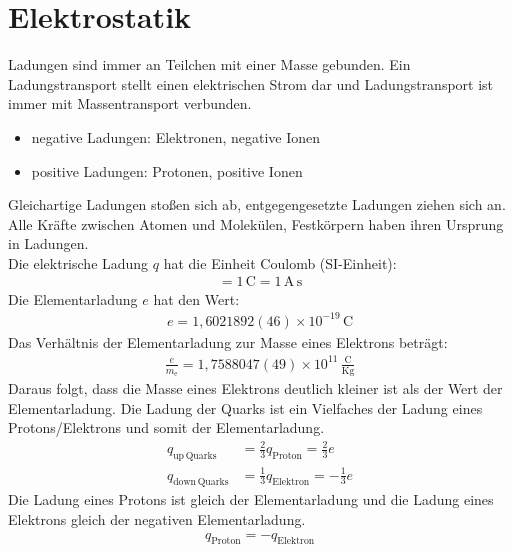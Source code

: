 \documentclass{article}
\begin{document}
\section{Elektrostatik}
Ladungen sind immer an Teilchen mit einer Masse gebunden. Ein Ladungstransport stellt einen elektrischen Strom dar und Ladungstransport
ist immer mit Massentransport verbunden.
\begin{itemize}
\item negative Ladungen: Elektronen, negative Ionen 
\item positive Ladungen: Protonen, positive Ionen
\end{itemize}
Gleichartige Ladungen stoßen sich ab, entgegengesetzte Ladungen ziehen sich an. Alle Kräfte zwischen Atomen und Molekülen,
Festkörpern haben ihren Ursprung in Ladungen.\\

Die elektrische Ladung $q$ hat die Einheit Coulomb (SI-Einheit):
\begin{align}
    [q]=1\,\mathrm{C}=1\,\mathrm{A\,s}
\end{align}
Die Elementarladung $e$ hat den Wert:
\begin{align}
    e=1,6021892(46)\times 10^{-19}\,\mathrm{C}
\end{align}
Das Verhältnis der Elementarladung zur Masse eines Elektrons beträgt:
\begin{align}
    \frac{e}{m_\mathrm{e}}=1,7588047(49)\times 10^{11}\,\frac{\mathrm{C}}{\mathrm{Kg}}
\end{align}
Daraus folgt, dass die Masse eines Elektrons deutlich kleiner ist als der Wert der Elementarladung.
Die Ladung der Quarks ist ein Vielfaches der Ladung eines Protons/Elektrons und somit der Elementarladung.
\begin{align}
    q_\mathrm{up\, Quarks}&=\frac{2}{3}q_\mathrm{Proton}=\frac{2}{3}e\\
    q_\mathrm{down\, Quarks}&=\frac{1}{3}q_\mathrm{Elektron}=-\frac{1}{3}e
\end{align}
Die Ladung eines Protons ist gleich der Elementarladung und die Ladung eines Elektrons gleich der negativen Elementarladung.
\begin{align}
    q_\mathrm{Proton}=-q_\mathrm{Elektron}
\end{align}
\end{document}
